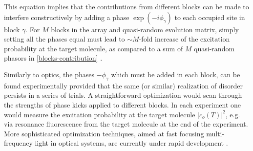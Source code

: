 This equation implies that the contributions
from different blocks can be made to interfere constructively by adding
 a phase $\exp(-i \phi_{\gamma})$ to each occupied site in block
 $\gamma$. For $M$ blocks in the array and quasi-random evolution matrix, simply setting all the phases equal
 must lead to $\sim M$-fold increase of the excitation probability at the target molecule, as compared to
 a sum of $M$ quasi-random phasors in \autoref{blocks-contribution} \cite{opaque-1}.

Similarly to optics, the phases $-\phi_\gamma$ which must be added in each block, can be found experimentally provided
that the same (or similar) realization of disorder persists in a series of
trials. A straightforward optimization would scan through the
strengths of  phase kicks applied to different blocks. In each
experiment one would measure the excitation probability at the
target molecule $|c_o(T)|^2$, e.g. via resonance fluorescence from
the target molecule at the end of the experiment. More
sophisticated optimization techniques, aimed at fast focusing
multi-frequency light in optical systems, are currently under
rapid development \cite{Gigan-TMeasure-PRL10, Mosk-NPhot10, Cizmar-NPhot10, Silberberg-11, Chatel-Focusing-11, Lagendijk-Focusing-11, zhenia-11, cui-11, kim-11}.



